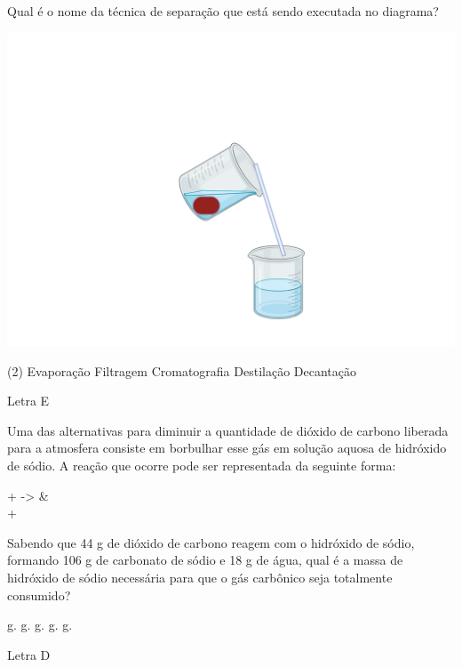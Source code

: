 \documentclass[11pt]{article}
\begin{document}
\begin{exercise}
Qual é o nome da técnica de separação que está sendo executada no diagrama?


\begin{center}
\includegraphics[scale=0.3]{../Listas/decanta.png}
\end{center}

\begin{choice}(2)
\choice Evaporação
\choice Filtragem
\choice Cromatografia
\choice Destilação
\choice Decantação
\end{choice}
\end{exercise}
\begin{solution}
Letra E
\end{solution}















\begin{exercise}
Uma das alternativas para diminuir a quantidade de dióxido de carbono liberada para a atmosfera consiste em borbulhar esse gás em solução aquosa de hidróxido de sódio. A reação que ocorre pode ser representada da seguinte forma:

\begin{reactions*}
 +  -> &\\   + 
\end{reactions*}
Sabendo que 44 g de dióxido de carbono reagem com o hidróxido de sódio, formando 106 g de carbonato de sódio e 18 g de água, qual é a massa de hidróxido de sódio necessária para que o gás carbônico seja totalmente consumido?

\begin{choice}
 g.
 g.
 g.
 g.
 g.
\end{choice}
\end{exercise}
\begin{solution}
Letra D
\end{solution}
\end{document}
